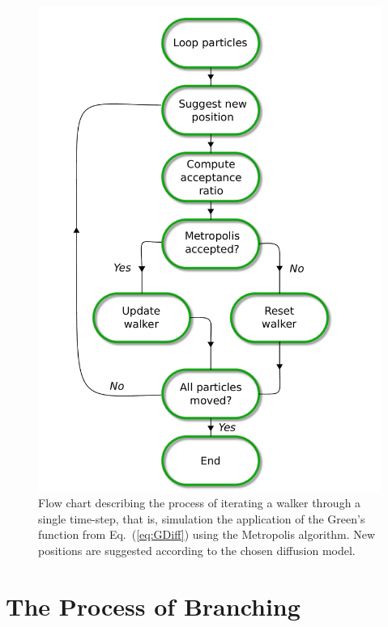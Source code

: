 \begin{figure}
 \begin{center}
  \includegraphics[scale=0.65]{../Graphics/DiffusionUML.pdf}
  \caption{Flow chart describing the process of iterating a walker through a single time-step, that is, simulation the application of the Green's function from Eq.~(\ref{eq:GDiff}) using the Metropolis algorithm. New positions are suggested according to the chosen diffusion model.}
  \label{fig:diffFlowChart}
 \end{center}
\end{figure}
\clearpage




\section{The Process of Branching}
\label{sec:branching}

